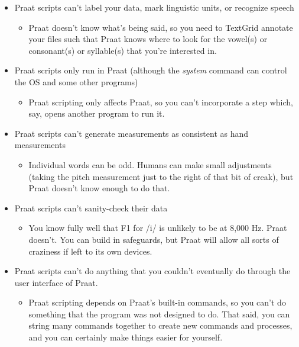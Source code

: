 \documentclass[11pt]{article}
\def\tightlist{}
\begin{document}
\begin{itemize}
\tightlist
\item
  Praat scripts can't label your data, mark linguistic units, or
  recognize speech

  \begin{itemize}
  \tightlist
  \item
    Praat doesn't know what's being said, so you need to TextGrid
    annotate your files such that Praat knows where to look for the
    vowel(s) or consonant(s) or syllable(s) that you're interested in.
  \end{itemize}
\item
  Praat scripts only run in Praat (although the \emph{system} command
  can control the OS and some other programs)

  \begin{itemize}
  \tightlist
  \item
    Praat scripting only affects Praat, so you can't incorporate a step
    which, say, opens another program to run it.
  \end{itemize}
\item
  Praat scripts can't generate measurements as consistent as hand
  measurements

  \begin{itemize}
  \tightlist
  \item
    Individual words can be odd. Humans can make small adjustments
    (taking the pitch measurement just to the right of that bit of
    creak), but Praat doesn't know enough to do that.
  \end{itemize}
\item
  Praat scripts can't sanity-check their data

  \begin{itemize}
  \tightlist
  \item
    You know fully well that F1 for /i/ is unlikely to be at 8,000 Hz.
    Praat doesn't. You can build in safeguards, but Praat will allow all
    sorts of craziness if left to its own devices.
  \end{itemize}
\item
  Praat scripts can't do anything that you couldn't eventually do
  through the user interface of Praat.

  \begin{itemize}
  \tightlist
  \item
    Praat scripting depends on Praat's built-in commands, so you can't
    do something that the program was not designed to do. That said, you
    can string many commands together to create new commands and
    processes, and you can certainly make things easier for yourself.
  \end{itemize}
\end{itemize}
\end{document}
